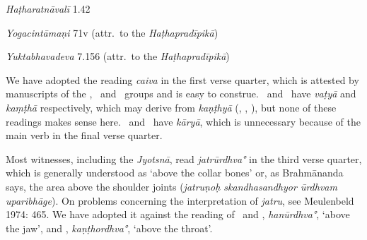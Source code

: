 \begin{ekdosis}

\begin{testimonia}[hp02_031]
\emph{Haṭharatnāvalī} 1.42

\begin{versinnote}
\end{versinnote}

\emph{Yogacintāmaṇi} 71v (attr.~to the \emph{Haṭhapradīpikā})

\begin{versinnote}
\end{versinnote}

\emph{Yuktabhavadeva} 7.156 (attr.~to the \emph{Haṭhapradīpikā})

\begin{versinnote}
\end{versinnote}

\end{testimonia}

\begin{philcomm}[hp02_031]
We have adopted the reading \emph{caiva} in the first verse quarter, which is attested by manuscripts of the \textbeta, \textgamma\ and \textdelta\ groups and is easy to construe. \alphaOne\ and \alphaTwo\ have \emph{vaṭyā} and \emph{kaṃṭhā} respectively, which may derive from \emph{kaṇṭhyā} (\alphaThree, \epsilonOne, \zetaOne), but none of these readings makes sense here. \etaOne\ and \etaTwo\ have \emph{kāryā}, which is unnecessary because of the main verb in the final verse quarter. \lb

Most witnesses, including the \emph{Jyotsnā}, read \emph{jatrūrdhva°} in the third verse quarter, which is generally understood as `above the collar bones' or, as Brahmānanda says, the area above the shoulder joints (\emph{jatruṇoḥ skandhasandhyor ūrdhvam upari\-bhāge}). On problems concerning the interpretation of \emph{jatru}, see Meulenbeld 1974: 465. We have adopted it against the reading of \alphaOne \ and \alphaTwo, \emph{hanūrdhva°}, ‘above the jaw’, and \alphaThree, \emph{kaṇṭhordhva°}, ‘above the throat’.\lb%


\end{philcomm}
\end{ekdosis}
